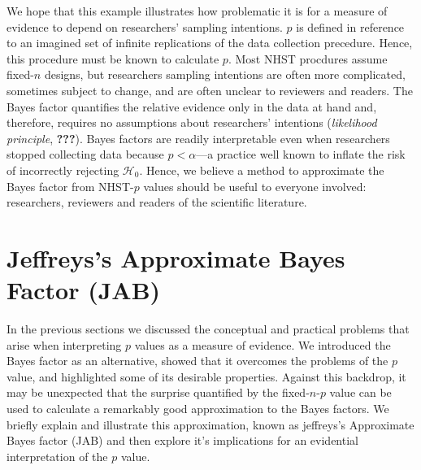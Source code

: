 \documentclass[
  man,
  floatsintext,
  longtable,
  nolmodern,
  notxfonts,
  notimes,
  colorlinks=true,linkcolor=blue,citecolor=blue,urlcolor=blue]{apa7}
\begin{document}
We hope that this example illustrates how problematic it is for a
measure of evidence to depend on researchers' sampling intentions. \(p\)
is defined in reference to an imagined set of infinite replications of
the data collection precedure. Hence, this procedure must be known to
calculate \(p\). Most NHST procdures assume fixed-\(n\) designs, but
researchers sampling intentions are often more complicated, sometimes
subject to change, and are often unclear to reviewers and readers. The
Bayes factor quantifies the relative evidence only in the data at hand
and, therefore, requires no assumptions about researchers' intentions
(\emph{likelihood principle}, \textbf{???}). Bayes factors are readily
interpretable even when researchers stopped collecting data because
\(p < \alpha\)---a practice well known to inflate the risk of
incorrectly rejecting \(\mathcal{H}_0\). Hence, we believe a method to
approximate the Bayes factor from NHST-\(p\) values should be useful to
everyone involved: researchers, reviewers and readers of the scientific
literature.

\section{Jeffreys's Approximate Bayes Factor
(JAB)}\label{jeffreyss-approximate-bayes-factor-jab}

In the previous sections we discussed the conceptual and practical
problems that arise when interpreting \(p\) values as a measure of
evidence. We introduced the Bayes factor as an alternative, showed that
it overcomes the problems of the \(p\) value, and highlighted some of
its desirable properties. Against this backdrop, it may be unexpected
that the surprise quantified by the fixed-\(n\)-\(p\) value can be used
to calculate a remarkably good approximation to the Bayes factors. We
briefly explain and illustrate this approximation, known as jeffreys's
Approximate Bayes factor (JAB) and then explore it's implications for an
evidential interpretation of the \(p\) value.
\end{document}
